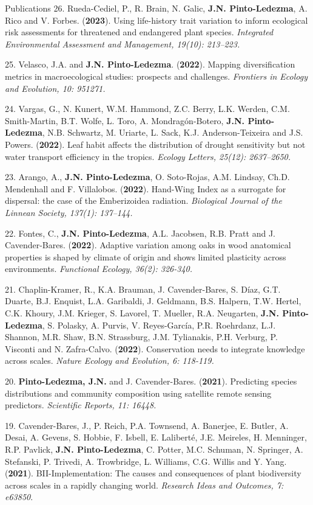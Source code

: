 \documentclass{resume} %
\begin{document}
\begin{rSection}{Publications}
{26.} {Rueda-Cediel, P., R. Brain, N. Galic, } {\bf{J.N. Pinto-Ledezma}}, {A. Rico and V. Forbes. ({\bf{2023}}). Using life-history trait variation to inform ecological risk assessments for threatened and endangered plant species.} {\em Integrated Environmental Assessment and Management, 19(10): 213–223.}

{25.} {Velasco\dag, J.A. and} {\bf{J.N. Pinto-Ledezma\dag}}. {({\bf{2022}}). Mapping diversification metrics in macroecological studies: prospects and challenges.} {\em Frontiers in Ecology and Evolution, 10: 951271.}

{24.}  {Vargas, G., N. Kunert, W.M. Hammond, Z.C. Berry, L.K. Werden, C.M. Smith-Martin, B.T. Wolfe, L. Toro, A. Mondragón-Botero, } {\bf{J.N. Pinto-Ledezma}}, {N.B. Schwartz, M. Uriarte, L. Sack, K.J. Anderson-Teixeira and J.S. Powers. ({\bf{2022}}). Leaf habit affects the distribution of drought sensitivity but not water transport efficiency in the tropics.} {\em Ecology Letters, 25(12): 2637–2650.}

{23.} {Arango, A.,} {\bf{J.N. Pinto-Ledezma}}, {O. Soto-Rojas, A.M. Lindsay, Ch.D. Mendenhall and F. Villalobos. ({\bf{2022}}). Hand-Wing Index as a surrogate for dispersal: the case of the Emberizoidea radiation.} {\em Biological Journal of the Linnean Society, 137(1): 137–144.}

{22.} {Fontes, C.,} {\bf{J.N. Pinto-Ledezma}}, {A.L. Jacobsen, R.B. Pratt and J. Cavender-Bares. ({\bf{2022}}). Adaptive variation among oaks in wood anatomical properties is shaped by climate of origin and shows limited plasticity across environments.} {\em Functional Ecology, 36(2): 326-340.}

{21.} {Chaplin-Kramer, R., K.A. Brauman, J. Cavender-Bares, S. Díaz, G.T. Duarte, B.J. Enquist, L.A. Garibaldi, J. Geldmann, B.S. Halpern, T.W. Hertel, C.K. Khoury, J.M. Krieger, S. Lavorel, T. Mueller, R.A. Neugarten,} {\bf{J.N. Pinto-Ledezma}}, {S. Polasky, A. Purvis, V. Reyes-García, P.R. Roehrdanz, L.J. Shannon, M.R. Shaw, B.N. Strassburg, J.M. Tylianakis, P.H. Verburg, P. Visconti and N. Zafra-Calvo. ({\bf{2022}}). Conservation needs to integrate knowledge across scales.} {\em Nature Ecology and Evolution, 6: 118-119.}

{20.} {\bf{Pinto-Ledezma, J.N.}} {and J. Cavender-Bares. ({{\bf 2021}}). Predicting species distributions and community composition using satellite remote sensing predictors.} {\em Scientific Reports, 11: 16448.}

{19.} {Cavender-Bares, J., P. Reich, P.A. Townsend, A. Banerjee, E. Butler, A. Desai, A. Gevens, S. Hobbie, F. Isbell, E. Laliberté, J.E. Meireles, H. Menninger, R.P. Pavlick, {\bf{J.N. Pinto-Ledezma}}, C. Potter, M.C. Schuman, N. Springer, A. Stefanski, P. Trivedi, A. Trowbridge, L. Williams, C.G. Willis and Y. Yang. ({{\bf 2021}}). BII-Implementation: The causes and consequences of plant biodiversity across scales in a rapidly changing world.} {\em Research Ideas and Outcomes, 7: e63850}. 


\end{rSection}
\end{document}
